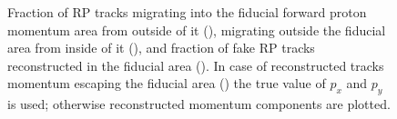 \begin{figure}
{  \begin{subfigure}[b]{\linewidth}{
                }
  \end{subfigure}
}%
\caption[Fractions of migrating and fake RP tracks.]{Fraction of RP tracks migrating into the fiducial forward proton momentum area from outside of it (), migrating outside the fiducial area from inside of it (), and fraction of fake RP tracks reconstructed in the fiducial area (). In case of reconstructed tracks momentum escaping the fiducial area () the true value of $p_{x}$ and $p_{y}$ is used; otherwise reconstructed momentum components are plotted.} \label{fig:migrationsAndFakes_RP}
\end{figure}





